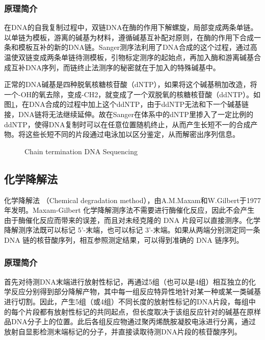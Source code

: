 \documentclass[12pt]{article} %
\begin{document}
\subsubsection{原理简介}
在DNA的自我复制过程中，双链DNA在酶的作用下解螺旋，局部变成两条单链。以单链为模板，游离的碱基为材料，遵循碱基互补配对原则，在酶的作用下合成一条和模板互补的新的DNA链。Sanger测序法利用了DNA合成的这个过程，通过高温使双链变成两条单链待测模板，引物标定测序的起始点，再加入酶和游离碱基合成互补DNA序列，而链终止法测序的秘密就在于加入的特殊碱基中。


正常的DNA碱基是四种脱氧核糖核苷酸（dNTP），如果将这个碱基稍加改造，将一个-OH的氧去除，变成-CH2，就变成了一个双脱氧的核糖核苷酸（ddNTP）。如图\ref{fig:sanger}，在DNA合成的过程中加上这个ddNTP，由于ddNTP无法和下一个碱基链接，DNA链将无法继续延伸。故在Sanger在体系中的dNTP里掺入了一定比例的ddNTP，使得DNA复制时可以在任意位置随机终止，从而产生长短不一的合成产物。将这些长短不同的片段通过电泳加以区分鉴定，从而解密出序列信息。

\begin{figure}[H] %
	\caption{Chain termination DNA Sequencing}
	\label{fig:sanger}
\end{figure}

\subsection{化学降解法} %
化学降解法 （Chemical degradation method），由A.M.Maxam和W.Gilbert于1977年发明。Maxam-Gilbert 化学降解测序法不需要进行酶催化反应，因此不会产生由于酶催化反应而带来的误差，而且对未经克隆的 DNA 片段可以直接测序。化学降解测序法既可以标记 5'-末端，也可以标记 3'-末端。如果从两端分别测定同一条 DNA 链的核苷酸序列，相互参照测定结果，可以得到准确的 DNA 链序列。


\subsubsection{原理简介} %
首先对待测DNA末端进行放射性标记，再通过5组（也可以是4组）相互独立的化学反应分别得到部分降解产物，其中每一组反应特异性地针对某一种或某一类碱基进行切割。因此，产生5组（或4组）不同长度的放射性标记的DNA片段，每组中的每个片段都有放射性标记的共同起点，但长度取决于该组反应针对的碱基在原样品DNA分子上的位置。此后各组反应物通过聚丙烯酰胺凝胶电泳进行分离，通过放射自显影检测末端标记的分子，并直接读取待测DNA片段的核苷酸序列。
\end{document}
